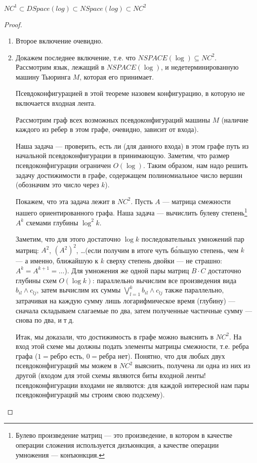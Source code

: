 \begin{theorem}
$NC^1 \subset DSpace(log) \subset NSpace(log) \subset NC^2$\\
\end{theorem}  
\begin{proof} 
\begin{enumerate}
\item Второе включение очевидно.

\item Докажем последнее включение, т.е. что $NSPACE(\log) \subseteq NC^2$.
Рассмотрим язык, лежащий в $NSPACE(\log)$, и недетерминированную машину 
Тьюринга $M$, которая его принимает. 

\begin{Def}
Псевдоконфигурацией в этой теореме назовем конфигурацию,
в которую не включается входная лента.
\end{Def}

Рассмотрим граф всех возможных псевдоконфигураций машины $M$
(наличие каждого из ребер в этом графе, очевидно, зависит от входа).

Наша задача --- проверить, есть ли (для данного входа) в этом графе
путь из начальной псевдоконфигурации в принимающую.
Заметим, что размер псевдоконфигурации ограничен $O(\log)$.
Таким образом, нам надо решить задачу достижимости в графе, содержащем
полиномиальное число вершин (обозначим это число через $k$).

Покажем, что эта задача лежит в $NC^2$. 
Пусть $A$ --- матрица смежности нашего ориентированного графа.
Наша задача --- вычислить булеву степень\footnote{Булево произведение
матриц --- это произведение, в котором в качестве операции сложения
используется дизъюнкция, а качестве операции умножения --- конъюнкция.} 
$A^k$ схемами глубины $\log^2k$.

Заметим, что для этого достаточно $\log k$ последовательных умножений 
пар матриц: $A^2$, $(A^2)^2$, \ldots (если получим в итоге чуть б\'ольшую
степень, чем $k$ --- а именно, ближайшую к $k$ сверху степень двойки ---
не страшно: $A^k=A^{k+1}=\ldots$). Для умножения же одной пары матриц 
$B\cdot C$ достаточно глубины схем $O(\log k)$:
параллельно вычислим все произведения вида $b_{il}\land c_{lj}$,
затем вычислим их суммы $\bigvee_{l=1}^k b_{il}\land c_{lj}$ также параллельно,
затрачивая на каждую сумму лишь логарифмическое время (глубину) ---
сначала складываем слагаемые по два, затем полученные частичные сумму ---
снова по два, и$\;$т$\;$д.

Итак, мы доказали, что достижимость в графе можно выяснить в $NC^2$.
На вход этой схеме мы должны подать элементы матрицы смежности,
т.е. ребра графа ($1=\textrm{ребро есть}$, $0=\textrm{ребра нет}$).
Понятно, что для любых двух псевдоконфигураций мы можем в $NC^2$ выяснить,
получена ли одна из них из другой (входом для этой схемы являются
биты входной ленты! псевдоконфигурации входами не являются: для каждой
интересной нам пары псевдоконфигураций мы строим свою подсхему).


\end{enumerate}
\end{proof}
